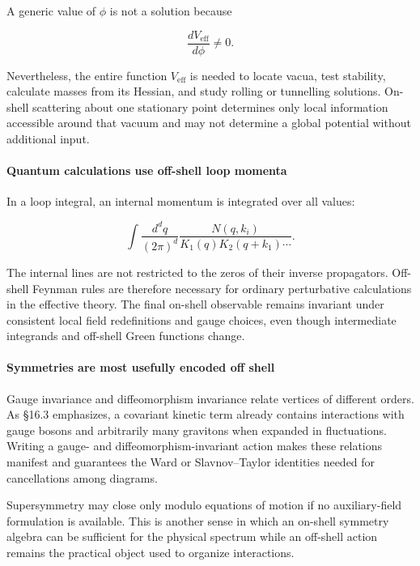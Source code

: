 \documentclass[
  10pt,
  a4paper,
  openany]{book}
\begin{document}
A generic value of \(\phi\) is not a solution because

\[
\frac{dV_{\mathrm{eff}}}{d\phi}\neq0.
\]

Nevertheless, the entire function \(V_{\mathrm{eff}}\) is needed to
locate vacua, test stability, calculate masses from its Hessian, and
study rolling or tunnelling solutions. On-shell scattering about one
stationary point determines only local information accessible around
that vacuum and may not determine a global potential without additional
input.

\paragraph{Quantum calculations use off-shell loop
momenta}\label{quantum-calculations-use-off-shell-loop-momenta}

In a loop integral, an internal momentum is integrated over all values:

\[
\int\frac{d^dq}{(2\pi)^d}
\frac{N(q,k_i)}{K_1(q)K_2(q+k_1)\cdots}.
\]

The internal lines are not restricted to the zeros of their inverse
propagators. Off-shell Feynman rules are therefore necessary for
ordinary perturbative calculations in the effective theory. The final
on-shell observable remains invariant under consistent local field
redefinitions and gauge choices, even though intermediate integrands and
off-shell Green functions change.

\paragraph{Symmetries are most usefully encoded off
shell}\label{symmetries-are-most-usefully-encoded-off-shell}

Gauge invariance and diffeomorphism invariance relate vertices of
different orders. As §16.3 emphasizes, a covariant kinetic term already
contains interactions with gauge bosons and arbitrarily many gravitons
when expanded in fluctuations. Writing a gauge- and
diffeomorphism-invariant action makes these relations manifest and
guarantees the Ward or Slavnov--Taylor identities needed for
cancellations among diagrams.

Supersymmetry may close only modulo equations of motion if no
auxiliary-field formulation is available. This is another sense in which
an on-shell symmetry algebra can be sufficient for the physical spectrum
while an off-shell action remains the practical object used to organize
interactions.
\end{document}
